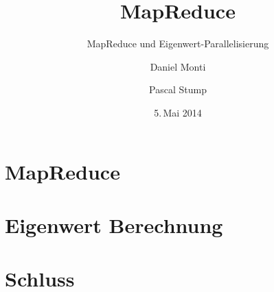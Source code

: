 \documentclass[compress,
               red]
              {beamer}
\title{MapReduce}
\subtitle{MapReduce und Eigenwert-Parallelisierung}
\author{Daniel Monti \and Pascal Stump}
\institute{HSR Hochschule für Technik Rapperswil}
\date{5.\,Mai 2014}
\begin{document}
\frame{
  \titlepage
}

\frame{
  \tableofcontents
}


\section{MapReduce}


\section{Eigenwert Berechnung}


\section{Schluss}


\end{document}
